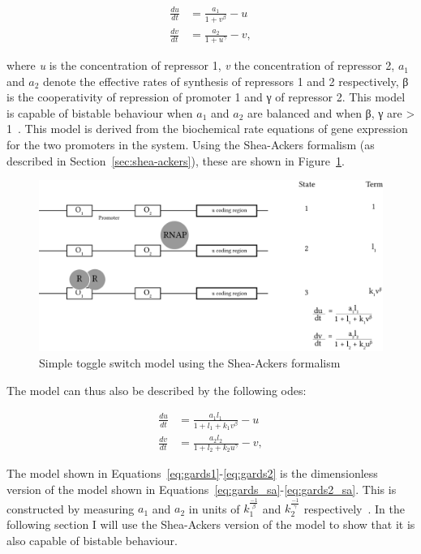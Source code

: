 \begin{align}\label{eq:gards1}
\frac{du}{dt} &= \frac{a_1}{1 +  v^{\beta}} - u \\ \label{eq:gards2}
\frac{dv}{dt} &= \frac{a_2}{1 +  u^{\gamma }} - v,
\end{align}

\noindent where \textit{u} is the concentration of repressor 1, \textit{v} the concentration of repressor 2, $a_1$ and $a_2$ denote the effective rates of synthesis of repressors 1 and 2 respectively, β is the cooperativity of repression of promoter 1 and γ of repressor 2. This model is capable of bistable behaviour when $a_1$ and $a_2$ are balanced and when β, γ are > 1~\autocite{Gardner:2000vha}. This model is derived from the biochemical rate equations of gene expression for the two promoters in the system. Using the Shea-Ackers formalism (as described in Section~\ref{sec:shea-ackers}), these are shown in Figure~\ref{fig:sa-GCS}.

\begin{figure}[tb]
\centerfloat
\includegraphics[scale=0.7]{../../chapters/chapterABCSysBio/images/shea-ackers-cs.png}
\caption[Simple toggle switch model using the Shea-Ackers formalism]{\label{fig:sa-GCS}Simple toggle switch model using the Shea-Ackers formalism}
\end{figure}


The model can thus also be described by the following \acrshort{ode}s:

\begin{align}\label{eq:gards_sa}
\frac{du}{dt} &= \frac{a_1  l_1}{1 + l_1 + k_1  v^{\beta}} - u \\\label{eq:gards2_sa}
\frac{dv}{dt} &= \frac{a_2  l_2}{1 + l_2 + k_2  u^{\gamma }} - v,
\end{align}

The model shown in Equations~\ref{eq:gards1}-\ref{eq:gards2} is the dimensionless version of the model shown in Equations~\ref{eq:gards_sa}-\ref{eq:gards2_sa}. This is constructed by measuring $a_1$ and $a_2$ in units of $k_{1}^{\frac{-1}{β}}$ and $k_{2}^{\frac{-1}{γ}}$ respectively~\autocite{phys_biol_cell}. In the following section I will use the Shea-Ackers version of the model to show that it is also capable of bistable behaviour. 

